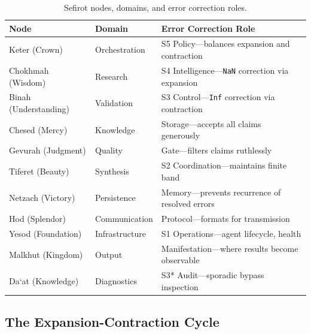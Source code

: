 \documentclass[11pt]{article}
\theoremstyle{definition}
\theoremstyle{remark}
\newcommand{\NaN}{\texttt{NaN}}
\newcommand{\Inf}{\texttt{Inf}}
\begin{document}
\begin{table}[ht]
\centering
\caption{Sefirot nodes, domains, and error correction roles.}
\label{tab:sefirot-nodes}
\begin{tabular}{@{}lll@{}}
\toprule
\textbf{Node} & \textbf{Domain} & \textbf{Error Correction Role} \\
\midrule
Keter (Crown)           & Orchestration  & S5 Policy---balances expansion and contraction \\
Chokhmah (Wisdom)       & Research       & S4 Intelligence---\NaN{} correction via expansion \\
Binah (Understanding)   & Validation     & S3 Control---\Inf{} correction via contraction \\
Chesed (Mercy)          & Knowledge      & Storage---accepts all claims generously \\
Gevurah (Judgment)      & Quality        & Gate---filters claims ruthlessly \\
Tiferet (Beauty)        & Synthesis      & S2 Coordination---maintains finite band \\
Netzach (Victory)       & Persistence    & Memory---prevents recurrence of resolved errors \\
Hod (Splendor)          & Communication  & Protocol---formats for transmission \\
Yesod (Foundation)      & Infrastructure & S1 Operations---agent lifecycle, health \\
Malkhut (Kingdom)       & Output         & Manifestation---where results become observable \\
Da\textquoteleft at (Knowledge) & Diagnostics & S3* Audit---sporadic bypass inspection \\
\bottomrule
\end{tabular}
\end{table}

\subsection{The Expansion-Contraction Cycle}
\label{sec:expansion-contraction}
\end{document}
